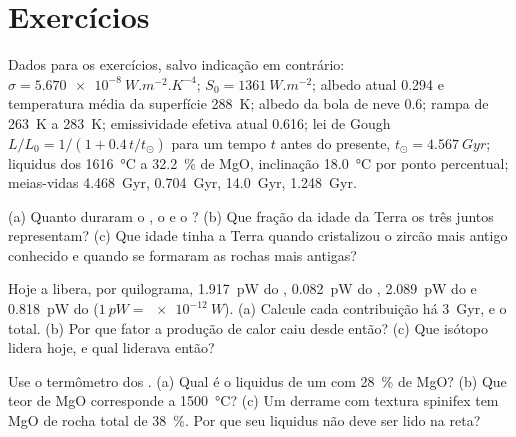 \section*{Exercícios}\label{sec:b2:precambrian-earth:exercises}

Dados para os exercícios, salvo indicação em contrário: $\sigma = \qty{5.670e-8}{W.m^{-2}.K^{-4}}$;
$S_0 = \qty{1361}{W.m^{-2}}$; albedo atual 0.294 e temperatura média da superfície \qty{288}{K};
albedo da bola de neve 0.6; rampa de \qty{263}{K} a \qty{283}{K}; emissividade efetiva atual
0.616; lei de Gough $L/L_0 = 1/(1 + 0.4\,t/t_\odot)$ para um tempo $t$ antes do presente, $t_\odot =
\qty{4.567}{Gyr}$; liquidus dos  \qty{1616}{\celsius} a \qty{32.2}{\percent} de MgO,
inclinação \qty{18.0}{\celsius} por ponto percentual; meias-vidas  \qty{4.468}{Gyr}, 
\qty{0.704}{Gyr},  \qty{14.0}{Gyr},  \qty{1.248}{Gyr}.

\begin{exercise}[$\star$]\label{exo:b2:precambrian-earth:1}
(a) Quanto duraram o , o  e o ? (b) Que fração da idade
da Terra os três juntos representam? (c) Que idade tinha a Terra quando cristalizou o zircão mais antigo
conhecido e quando se formaram as rochas mais antigas?
\end{exercise}

\begin{exercise}[$\star$]\label{exo:b2:precambrian-earth:2}
Hoje a  libera, por quilograma, \qty{1.917}{pW} do ,
\qty{0.082}{pW} do , \qty{2.089}{pW} do  e \qty{0.818}{pW} do
 ($\qty{1}{pW} = \qty{e-12}{W}$). (a) Calcule cada contribuição há \qty{3}{Gyr}, e
o total. (b) Por que fator a produção de calor caiu desde então? (c) Que isótopo lidera
hoje, e qual liderava então?
\end{exercise}

\begin{exercise}[$\star$]\label{exo:b2:precambrian-earth:3}
Use o termômetro dos . (a) Qual é o liquidus de um  com
\qty{28}{\percent} de MgO? (b) Que teor de MgO corresponde a \qty{1500}{\celsius}? (c) Um
derrame com textura spinifex tem MgO de rocha total de \qty{38}{\percent}. Por que seu liquidus não
deve ser lido na reta?
\end{exercise}


